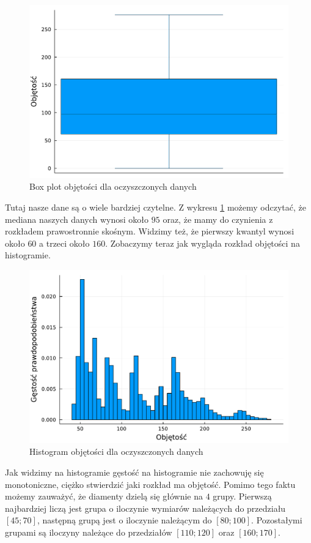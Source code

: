 \documentclass[12pt,leqno]{article}
\theoremstyle{exer}
\begin{document}
	\begin{figure}[H]
		\centering
		\includegraphics[width=4\columnwidth/5]{images/Budnik/boxplot_V_danych.pdf}
		\caption{Box plot objętości dla oczyszczonych danych}
		\label{fig:box_V}
	\end{figure}
	Tutaj nasze dane są o wiele bardziej czytelne. Z wykresu \ref{fig:box_V} możemy odczytać, że mediana naszych danych wynosi około $95$ oraz, że mamy do czynienia z rozkładem prawostronnie skośnym. Widzimy też, że pierwszy kwantyl wynosi około $60$ a trzeci około $160$.
	Zobaczymy teraz jak wygląda rozkład objętości na histogramie.
	\begin{figure}[H]
		\centering
		\includegraphics[width=4\columnwidth/5]{images/histogram_V.pdf}
		\caption{Histogram objętości dla oczyszczonych danych}
		\label{fig:hist_V}
	\end{figure}
	Jak widzimy na histogramie gęstość na histogramie nie zachowuję się monotoniczne, ciężko stwierdzić jaki rozkład ma objętość. Pomimo tego faktu możemy zauważyć, że diamenty dzielą się głównie na $4$ grupy. Pierwszą najbardziej liczą jest grupa o iloczynie wymiarów należących do przedziału $[45;70] $, następną grupą jest o iloczynie należącym do $[80;100]$. Pozostałymi grupami są iloczyny należące do przedziałów $[110;120]$ oraz $[160;170]$.
	
\end{document}
